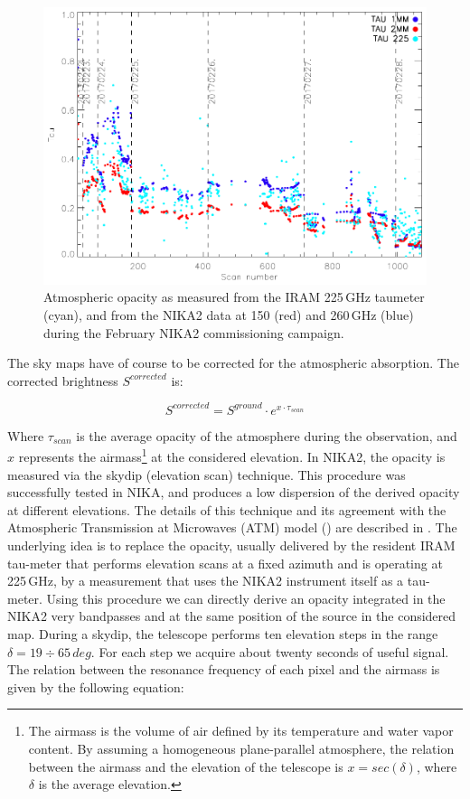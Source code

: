 \documentclass[]{aa} %
\begin{document}
\begin{figure}
\includegraphics[scale=0.55]{./opacity_evol_run22.pdf}
\caption{Atmospheric opacity as measured from the IRAM 225\,GHz taumeter (cyan), and from the NIKA2 data at 150 (red) and 260\,GHz (blue) during the February NIKA2 commissioning campaign. \label{fig:taumeas}}
\end{figure}

The sky maps have of course to be corrected for the atmospheric absorption. The corrected brightness $S^{corrected}$ is:

\begin{equation}
S^{corrected} =  S^{ground} \cdot e^{ x \cdot \tau_{scan}}
\end{equation}

Where $\tau_{scan}$ is the average opacity of the atmosphere during the observation, and $x$ represents the airmass\footnote{The airmass is the volume of air defined by its temperature and water vapor content. By assuming a homogeneous plane-parallel atmosphere, the relation between the airmass and the elevation of the telescope is $x = sec(\delta)$, where $\delta$ is the average elevation.} at the considered elevation.
In NIKA2, the opacity is measured via the skydip (elevation scan) technique. This procedure was successfully tested in NIKA, and produces a low dispersion of the derived opacity at different elevations. The details of this technique and its agreement with the Atmospheric Transmission at Microwaves (ATM) model (\cite{2001IEEE....49.1683C}) are described in \cite{Catalano2014}. The underlying idea is to replace the opacity, usually delivered by the resident IRAM tau-meter that performs elevation scans at a fixed azimuth and is operating at 225\,GHz, by a measurement that uses the NIKA2 instrument itself as a tau-meter. Using this procedure we can directly derive an opacity integrated in the NIKA2 very bandpasses and at the same position of the source in the considered map. 
During a skydip, the telescope performs ten elevation steps in the range $\delta = 19\div65\,deg$. For each step we acquire about twenty seconds of useful signal. The relation between the resonance frequency of each pixel and the airmass is given by the following equation:
\end{document}
